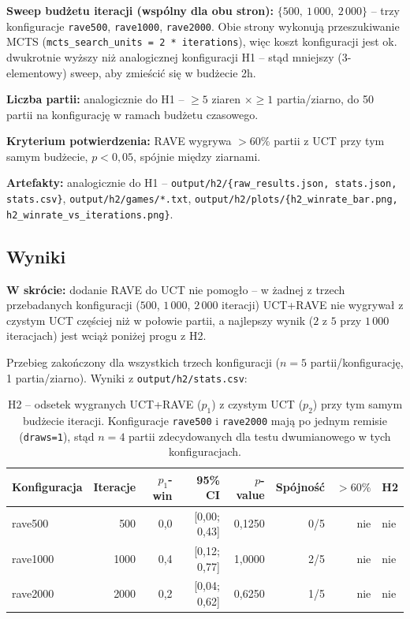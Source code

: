 \documentclass[11pt,a4paper]{article}
\begin{document}
\textbf{Sweep budżetu iteracji (wspólny dla obu stron):}
$\{500,\ 1\,000,\ 2\,000\}$ -- trzy konfiguracje \texttt{rave500},
\texttt{rave1000}, \texttt{rave2000}. Obie strony wykonują przeszukiwanie
MCTS (\texttt{mcts\_search\_units = 2 * iterations}), więc koszt
konfiguracji jest ok. dwukrotnie wyższy niż analogicznej konfiguracji H1 --
stąd mniejszy (3-elementowy) sweep, aby zmieścić się w budżecie 2h.

\textbf{Liczba partii:} analogicznie do H1 -- $\geq 5$ ziaren $\times \geq
1$ partia/ziarno, do 50 partii na konfigurację w ramach budżetu czasowego.

\textbf{Kryterium potwierdzenia:} RAVE wygrywa $> 60\%$ partii z UCT przy
tym samym budżecie, $p < 0{,}05$, spójnie między ziarnami.

\textbf{Artefakty:} analogicznie do H1 --
\texttt{output/h2/\{raw\_results.json, stats.json, stats.csv\}},
\texttt{output/h2/games/*.txt},
\texttt{output/h2/plots/\{h2\_winrate\_bar.png,
h2\_winrate\_vs\_iterations.png\}}.

\subsection{Wyniki}
\label{sec:h2-wyniki}

\textbf{W skrócie:} dodanie RAVE do UCT nie pomogło -- w żadnej z trzech
przebadanych konfiguracji ($500$, $1\,000$, $2\,000$ iteracji) UCT+RAVE nie
wygrywał z czystym UCT częściej niż w połowie partii, a najlepszy wynik
($2$ z $5$ przy $1\,000$ iteracjach) jest wciąż poniżej progu z H2.

Przebieg zakończony dla wszystkich trzech konfiguracji
($n=5$ partii/konfigurację, 1 partia/ziarno). Wyniki z
\texttt{output/h2/stats.csv}:

\begin{table}[h]
\centering
\begin{tabular}{lrrrrrrl}
\toprule
Konfiguracja & Iteracje & $p_1$-win & 95\% CI & $p$-value & Spójność & $> 60\%$ & H2 \\
\midrule
rave500  & 500  & 0{,}0 & [0{,}00; 0{,}43] & 0{,}1250 & 0/5 & nie & nie \\
rave1000 & 1000 & 0{,}4 & [0{,}12; 0{,}77] & 1{,}0000 & 2/5 & nie & nie \\
rave2000 & 2000 & 0{,}2 & [0{,}04; 0{,}62] & 0{,}6250 & 1/5 & nie & nie \\
\bottomrule
\end{tabular}
\caption{H2 -- odsetek wygranych UCT+RAVE ($p_1$) z czystym UCT ($p_2$)
przy tym samym budżecie iteracji. Konfiguracje \texttt{rave500} i
\texttt{rave2000} mają po jednym remisie (\texttt{draws=1}), stąd $n=4$
partii zdecydowanych dla testu dwumianowego w tych konfiguracjach.}
\end{table}
\end{document}
